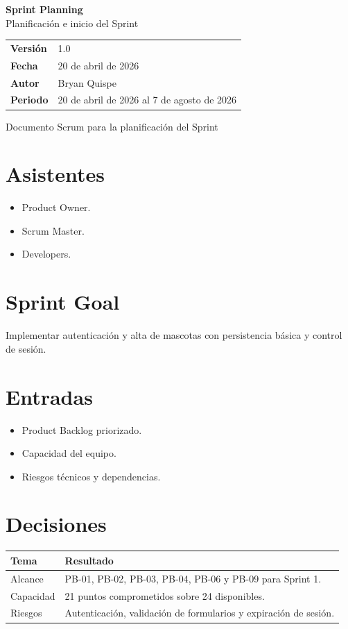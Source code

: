\documentclass[12pt,a4paper]{article}
\title{\Huge\textbf{Sprint Planning}\[0.3em]\Large Plataforma Web de Mascotas 3D}
\author{Bryan Quispe}
\date{20 de abril de 2026}
\begin{document}
\begin{titlepage}
\centering
\vspace*{1.8cm}
{\Huge\bfseries\color{PrimaryBlue} Sprint Planning\\[0.35em]}
{\LARGE Planificación e inicio del Sprint\\[1.2cm]}

\begin{tabular}{p{5cm} p{8cm}}
\rowcolor{SoftGray}
\textbf{Versión} & 1.0 \\
\textbf{Fecha} & 20 de abril de 2026 \\
\textbf{Autor} & Bryan Quispe \\
\textbf{Periodo} & 20 de abril de 2026 al 7 de agosto de 2026 \\
\end{tabular}

\vfill
{\large Documento Scrum para la planificación del Sprint}
\end{titlepage}

\section{Asistentes}
\begin{itemize}[leftmargin=*]
    \item Product Owner.
    \item Scrum Master.
    \item Developers.
\end{itemize}

\section{Sprint Goal}
Implementar autenticación y alta de mascotas con persistencia básica y control de sesión.

\section{Entradas}
\begin{itemize}[leftmargin=*]
    \item Product Backlog priorizado.
    \item Capacidad del equipo.
    \item Riesgos técnicos y dependencias.
\end{itemize}

\section{Decisiones}
\begin{longtable}{p{4cm} p{9cm}}
\toprule
\textbf{Tema} & \textbf{Resultado} \\
\midrule
Alcance & PB-01, PB-02, PB-03, PB-04, PB-06 y PB-09 para Sprint 1. \\
Capacidad & 21 puntos comprometidos sobre 24 disponibles. \\
Riesgos & Autenticación, validación de formularios y expiración de sesión. \\
\bottomrule
\end{longtable}
\end{document}
